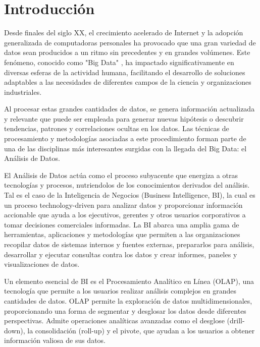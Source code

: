 \chapter*{Introducción}\label{chapter:introduction}

Desde finales del siglo XX, el crecimiento acelerado de Internet y la adopci\'on generalizada de computadoras 
personales ha provocado que una gran variedad de datos sean producidos a un ritmo sin precedentes y en grandes vol\'umenes. 
Este fen\'omeno, conocido como "Big Data" \cite{beyer2012importance}, ha impactado significativamente en diversas esferas de la actividad humana, 
facilitando el desarrollo de soluciones adaptables a las necesidades de diferentes campos de la ciencia y organizaciones 
industriales.

Al procesar estas grandes cantidades de datos, se genera información actualizada y relevante que puede ser empleada 
para generar nuevas hipótesis o descubrir tendencias, patrones y correlaciones ocultas en los datos. Las técnicas de 
procesamiento y metodologías asociadas a este procedimiento forman parte de una de las disciplinas más interesantes 
surgidas con la llegada del Big Data: el Análisis de Datos.

El An\'alisis de Datos act\'ua como el proceso subyacente que energiza a otras tecnolog\'ias y procesos, nutriendolos
de los conocimientos derivados del an\'alisis. Tal es el 
caso de la Inteligencia de Negocios (Business Intelligence, BI), la cual es un proceso technology-driven para 
analizar datos y proporcionar información accionable que ayuda a los ejecutivos, gerentes y otros usuarios corporativos 
a tomar decisiones comerciales informadas. La BI abarca una amplia gama de herramientas, aplicaciones y metodologías 
que permiten a las organizaciones recopilar datos de sistemas internos y fuentes externas, prepararlos para análisis, 
desarrollar y ejecutar consultas contra los datos y crear informes, paneles y visualizaciones de datos\cite{negash2004business}. 

Un elemento esencial de BI es el Procesamiento Analítico en Línea (OLAP), una tecnología que permite a los usuarios realizar 
análisis complejos en grandes cantidades de datos. OLAP permite la exploración de datos multidimensionales, proporcionando 
una forma de segmentar y desglosar los datos desde diferentes perspectivas. Admite operaciones analíticas avanzadas como 
el desglose (drill-down), la consolidación (roll-up) y el pivote, que ayudan a los usuarios a obtener información valiosa 
de sus datos.

